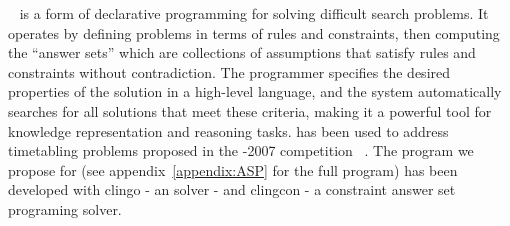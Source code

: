 \documentclass[runningheads]{llncs}
\begin{document}
\ASP{}~\cite{2003_BARAL_BOOK} is a form of declarative programming for solving difficult search problems. 
It operates by defining problems in terms of rules and constraints, then computing the ``answer sets'' which are collections of assumptions that satisfy rules and constraints without contradiction.
The programmer specifies the desired properties of the solution in a high-level language, and the \ASP{} system automatically searches for all solutions that meet these criteria, making it a powerful tool for knowledge representation and reasoning tasks. 
\ASP{} has been used to address timetabling problems proposed in the \ITC{}-2007 competition
~\cite{2019_banbara_AOR}.
The \ASP{} program we propose for \UTP{}  
(see appendix~\ref{appendix:ASP} for the full program)
has been developed with clingo - an \ASP{} solver - and clingcon - a constraint answer set programing solver.













































%
 
\end{document}
